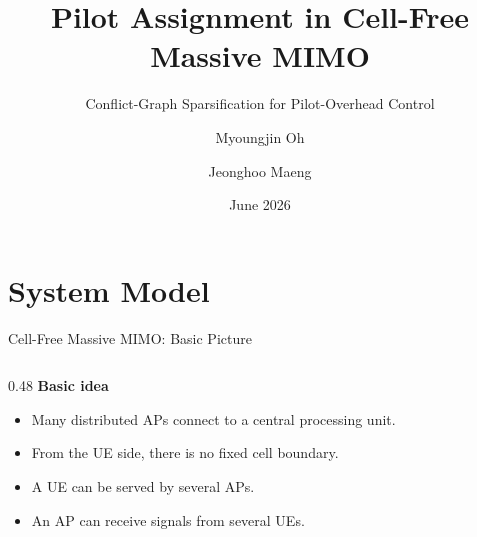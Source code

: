 \documentclass[10pt,aspectratio=169]{beamer}
\title{Pilot Assignment in Cell-Free Massive MIMO}
\subtitle{Conflict-Graph Sparsification for Pilot-Overhead Control}
\author{Myoungjin Oh \and Jeonghoo Maeng}
\date{June 2026}
\newenvironment{tightitemize}{%
    \begin{itemize}
        \setlength{\itemsep}{1pt}
        \setlength{\parskip}{0pt}
        \setlength{\parsep}{0pt}
}{%
    \end{itemize}
}
\begin{document}
\begin{frame}[plain]
    \titlepage
\end{frame}

\section{System Model}

\begin{frame}{Cell-Free Massive MIMO: Basic Picture}
    \footnotesize
    \begin{columns}[T,onlytextwidth]
        \begin{column}{0.48\textwidth}
            \textbf{Basic idea}
            \begin{tightitemize}
                \item Many distributed APs connect to a central processing unit.
                \item From the UE side, there is no fixed cell boundary.
                \item A UE can be served by several APs.
                \item An AP can receive signals from several UEs.
            \end{tightitemize}


\end{column}
\end{columns}
\end{frame}
\end{document}

